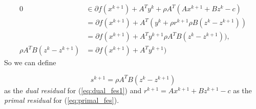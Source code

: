 \begin{align*}
	0 &\in \partial f(x^{k+1}) +A^Ty^k+\rho A^T(Ax^{k+1}+Bz^k-c)\\
	&=\partial  f(x^{k+1}) + A^T(y^k+\rho r^{k+1} \rho B(z^k - z^{k+1}))\\
	&=\partial f(x^{k+1}) + A^Ty^{k+1} \rho A^TB(z^k - z^{k+1})),\\	
	\rho A^TB(z^k - z^{k+1})&=\partial f(x^{k+1}) + A^Ty^{k+1})
\end{align*}
So we can define  

\begin{equation*}
	s^{k+1} = \rho A^TB(z^k - z^{k+1})
\end{equation*}
as the \textit{dual residual} for (\ref{eq:dual_fes1}) and $r^{k+1}=Ax^{k+1}+Bz^{k+1}-c$ as the \textit{primal residual} for (\ref{eq:primal_fes}).




